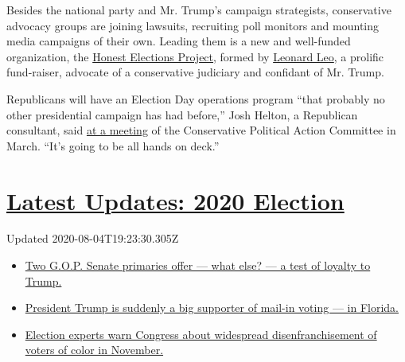 Besides the national party and Mr. Trump's campaign strategists,
conservative advocacy groups are joining lawsuits, recruiting poll
monitors and mounting media campaigns of their own. Leading them is a
new and well-funded organization, the
\href{https://www.honestelections.org/}{Honest Elections Project},
formed by
\href{https://www.washingtonpost.com/graphics/2019/investigations/leonard-leo-federalists-society-courts/}{Leonard
Leo}, a prolific fund-raiser, advocate of a conservative judiciary and
confidant of Mr. Trump.

Republicans will have an Election Day operations program ``that probably
no other presidential campaign has had before,'' Josh Helton, a
Republican consultant, said
\href{https://cpac.conservative.org/protecting-the-ballot-box-defeating-the-lefts-voter-fraud-machine/}{at
a meeting} of the Conservative Political Action Committee in March.
``It's going to be all hands on deck.''

\hypertarget{latest-updates-2020-election}{%
\section{\texorpdfstring{\href{https://www.nytimes.com/2020/08/04/us/elections/primary-election-michigan-arizona-kansas.html?action=click\&pgtype=Article\&state=default\&region=MAIN_CONTENT_1\&context=storylines_live_updates}{Latest
Updates: 2020
Election}}{Latest Updates: 2020 Election}}\label{latest-updates-2020-election}}

Updated 2020-08-04T19:23:30.305Z

\begin{itemize}
\tightlist
\item
  \href{https://www.nytimes.com/2020/08/04/us/elections/primary-election-michigan-arizona-kansas.html?action=click\&pgtype=Article\&state=default\&region=MAIN_CONTENT_1\&context=storylines_live_updates\#link-3924dd44}{Two
  G.O.P. Senate primaries offer --- what else? --- a test of loyalty to
  Trump.}
\item
  \href{https://www.nytimes.com/2020/08/04/us/elections/primary-election-michigan-arizona-kansas.html?action=click\&pgtype=Article\&state=default\&region=MAIN_CONTENT_1\&context=storylines_live_updates\#link-32b39e33}{President
  Trump is suddenly a big supporter of mail-in voting --- in Florida.}
\item
  \href{https://www.nytimes.com/2020/08/04/us/elections/primary-election-michigan-arizona-kansas.html?action=click\&pgtype=Article\&state=default\&region=MAIN_CONTENT_1\&context=storylines_live_updates\#link-6d019753}{Election
  experts warn Congress about widespread disenfranchisement of voters of
  color in November.}
\end{itemize}

